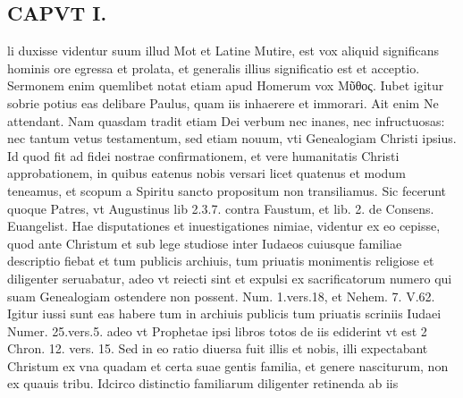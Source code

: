 \documentclass{article}
\begin{document}
\begin{pages}
\section*{CAPVT  I. }
\marginpar{[ p.11 ]}\pstart li duxisse videntur suum illud Mot et Latine Mutire, est vox aliquid significans hominis ore egressa et prolata, et generalis illius significatio est et acceptio. Sermonem enim quemlibet notat etiam apud Homerum vox Μῦθος. Iubet igitur sobrie potius eas delibare Paulus, quam iis inhaerere et immorari. Ait enim Ne attendant. Nam quasdam tradit etiam Dei verbum nec inanes, nec infructuosas: nec tantum vetus testamentum, sed etiam nouum, vti Genealogiam Christi ipsius. Id quod fit ad fidei nostrae confirmationem, et vere humanitatis Christi approbationem, in quibus eatenus nobis versari licet quatenus et modum teneamus, et scopum a Spiritu sancto propositum non transiliamus. Sic fecerunt quoque Patres, vt Augustinus lib 2.3.7. contra Faustum, et lib. 2. de Consens. Euangelist. Hae disputationes et inuestigationes nimiae, videntur ex eo cepisse, quod ante Christum et sub lege studiose inter Iudaeos cuiusque familiae descriptio fiebat et tum publicis archiuis, tum priuatis monimentis religiose et diligenter seruabatur, adeo vt reiecti sint et expulsi ex sacrificatorum numero qui suam Genealogiam ostendere non possent. Num. 1.vers.18, et Nehem. 7. V.62. Igitur iussi sunt eas habere tum in archiuis publicis tum priuatis scriniis Iudaei Numer. 25.vers.5. adeo vt Prophetae ipsi libros totos de iis ediderint vt est 2 Chron. 12. vers. 15. Sed in eo ratio diuersa fuit illis et nobis, illi expectabant Christum ex vna quadam et certa suae gentis familia, et genere nasciturum, non ex quauis tribu. Idcirco distinctio familiarum diligenter retinenda ab iis  \pend

\end{pages}
\end{document}
